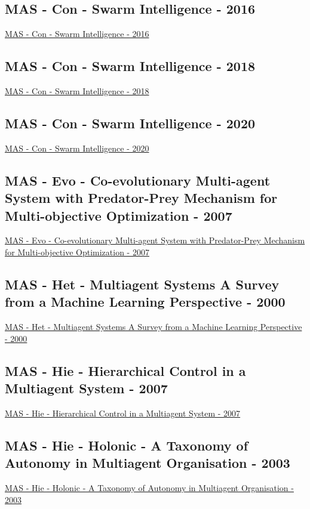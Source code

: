 \subsection{MAS - Con - Swarm Intelligence - 2016}
\href{https://link.springer.com/book/10.1007/978-3-319-44427-7}{MAS - Con - Swarm Intelligence - 2016}

\subsection{MAS - Con - Swarm Intelligence - 2018}
\href{https://link.springer.com/book/10.1007/978-3-030-00533-7}{MAS - Con - Swarm Intelligence - 2018}

\subsection{MAS - Con - Swarm Intelligence - 2020}
\href{https://link.springer.com/book/10.1007/978-3-030-60376-2}{MAS - Con - Swarm Intelligence - 2020}

\subsection{MAS - Evo - Co-evolutionary Multi-agent System with Predator-Prey Mechanism for Multi-objective Optimization - 2007}
\href{https://link.springer.com/chapter/10.1007/978-3-540-71618-1_8}{MAS - Evo - Co-evolutionary Multi-agent System with Predator-Prey Mechanism for Multi-objective Optimization - 2007}

\subsection{MAS - Het - Multiagent Systems A Survey from a Machine Learning Perspective - 2000}
\href{https://link.springer.com/article/10.1023/A:1008942012299}{MAS - Het - Multiagent Systems A Survey from a Machine Learning Perspective - 2000}

\subsection{MAS - Hie - Hierarchical Control in a Multiagent System - 2007}
\href{https://ieeexplore.ieee.org/abstract/document/4427756}{MAS - Hie - Hierarchical Control in a Multiagent System - 2007}

\subsection{MAS - Hie - Holonic - A Taxonomy of Autonomy in Multiagent Organisation - 2003}
\href{https://link.springer.com/chapter/10.1007/978-3-540-25928-2_6}{MAS - Hie - Holonic - A Taxonomy of Autonomy in Multiagent Organisation - 2003}



